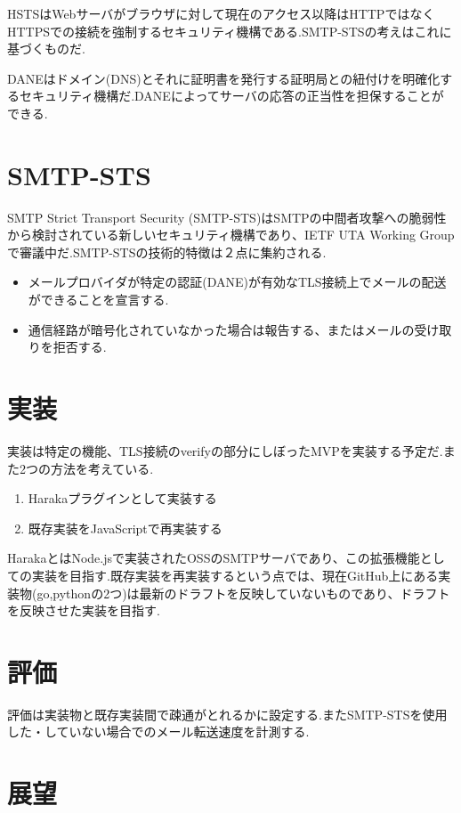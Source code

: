 \documentclass[a4j,10pt]{jsarticle}
\begin{document}
HSTSはWebサーバがブラウザに対して現在のアクセス以降はHTTPではなくHTTPSでの接続を強制するセキュリティ機構である.SMTP-STSの考えはこれに基づくものだ.

DANEはドメイン(DNS)とそれに証明書を発行する証明局との紐付けを明確化するセキュリティ機構だ.DANEによってサーバの応答の正当性を担保することができる.

\section{SMTP-STS}

SMTP Strict Transport Security (SMTP-STS)はSMTPの中間者攻撃への脆弱性から検討されている新しいセキュリティ機構であり、IETF UTA Working Groupで審議中だ.\cite{draft}SMTP-STSの技術的特徴は２点に集約される.

\begin{itemize}
\item メールプロバイダが特定の認証(DANE)が有効なTLS接続上でメールの配送ができることを宣言する.
\item 通信経路が暗号化されていなかった場合は報告する、またはメールの受け取りを拒否する.
\end{itemize}

\section{実装}

実装は特定の機能、TLS接続のverifyの部分にしぼったMVPを実装する予定だ.また2つの方法を考えている.

\begin{enumerate}
\item Harakaプラグインとして実装する
\item 既存実装をJavaScriptで再実装する
\end{enumerate}

HarakaとはNode.jsで実装されたOSSのSMTPサーバであり、この拡張機能としての実装を目指す.既存実装を再実装するという点では、現在GitHub上にある実装物(go,pythonの2つ)は最新のドラフトを反映していないものであり、ドラフトを反映させた実装を目指す.

\section{評価}

評価は実装物と既存実装間で疎通がとれるかに設定する.またSMTP-STSを使用した・していない場合でのメール転送速度を計測する.

\section{展望}
\end{document}
